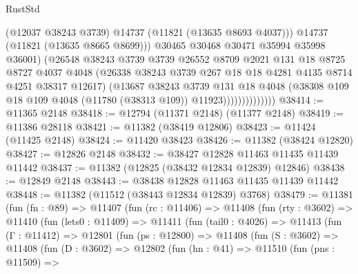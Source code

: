 \begin{lexlean}{RustStd}
\begin{coremodule}
                                (@12037 @38243 @3739)
                                @14737
                                (@11821 (@13635 @8693 @4037)))
                              @14737
                              (@11821 (@13635 @8665 @8699)))
                            @30465
                            @30468
                            @30471
                            @35994
                            @35998
                            @36001)
                          (@26548
                            @38243
                            @3739
                            @3739
                            @26552
                            @8709
                            @2021
                            @131
                            @18
                            @8725
                            @8727
                            @4037
                            @4048
                            (@26338 @38243 @3739 @267 @18 @18 @4281 @4135 @8714 @4251 @38317 @12617)
                            (@13687
                              @38243
                              @3739
                              @131
                              @18
                              @4048
                              (@38308
                                @109
                                @18
                                @109
                                @4048
                                (@11780 (@38313 @109))
                                @11923))))))))))))))
@38414 := @11365 @2148
@38418 := @12794 (@11371 @2148) (@11377 @2148)
@38419 := @11386 @28118
@38421 := @11382 (@38419 @12806)
@38423 := @11424 (@11425 @2148)
@38424 := @11420 @38423
@38426 := @11382 (@38424 @12820)
@38427 := @12826 @2148
@38432 := @38427 @12828 @11463 @11435 @11439 @11442
@38437 := @11382 (@12825 (@38432 @12834 @12839) @12846)
@38438 := @12849 @2148
@38443 := @38438 @12828 @11463 @11435 @11439 @11442
@38448 := @11382 (@11512 (@38443 @12834 @12839) @3768)
@38479 := @11381
    (fun (fn : @89) =>
    @11407
      (fun (rc : @11406) =>
      @11408
        (fun (rty : @3602) =>
        @11410
          (fun (lets0 : @11409) =>
          @11411
            (fun (tail0 : @4026) =>
            @11413
              (fun (Γ : @11412) =>
              @12801
                (fun (ps : @12800) =>
                @11408
                  (fun (S : @3602) =>
                  @11408
                    (fun (D : @3602) =>
                    @12802
                      (fun (hn : @41) =>
                      @11510
                        (fun (pns : @11509) =>

\end{coremodule}
\end{lexlean}

